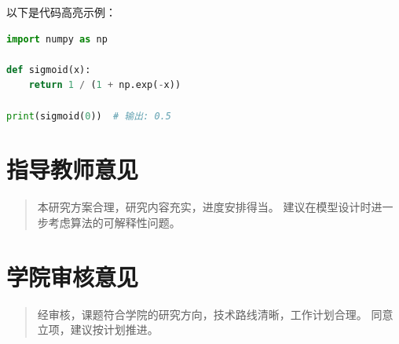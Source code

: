 \documentclass{xduugtp}
\begin{document}
以下是代码高亮示例：
\begin{lstlisting}[language=Python, caption=简单的Python示例代码, basicstyle=\ttfamily\small]
import numpy as np

def sigmoid(x):
    return 1 / (1 + np.exp(-x))

print(sigmoid(0))  # 输出: 0.5
\end{lstlisting}

\section{指导教师意见}
\begin{quotation}
    本研究方案合理，研究内容充实，进度安排得当。  
    建议在模型设计时进一步考虑算法的可解释性问题。
\end{quotation}

\section{学院审核意见}
\begin{quotation}
    经审核，课题符合学院的研究方向，技术路线清晰，工作计划合理。  
    同意立项，建议按计划推进。
\end{quotation}
\end{document}
